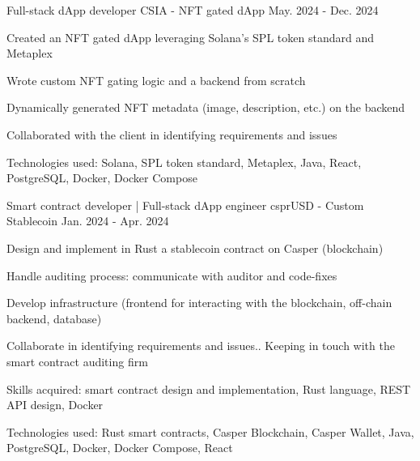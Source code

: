\begin{cventries}
  \cventry
    {Full-stack dApp developer} %
    {CSIA - NFT gated dApp} %
    {} %
    {May. 2024 - Dec. 2024} %
    {
      \begin{cvitems} %
        \item {Created an NFT gated dApp leveraging Solana's SPL token standard and Metaplex}
        \item {Wrote custom NFT gating logic and a backend from scratch}
        \item {Dynamically generated NFT metadata (image, description, etc.) on the backend}
        \item {Collaborated with the client in identifying requirements and issues}
        \item {Technologies used: Solana, SPL token standard, Metaplex, Java, React, PostgreSQL, Docker, Docker Compose}
      \end{cvitems}
    }

  \cventry
    {Smart contract developer | Full-stack dApp engineer} %
    {csprUSD - Custom Stablecoin} %
    {} %
    {Jan. 2024 - Apr. 2024} %
    {
      \begin{cvitems} %
        \item {Design and implement in Rust a stablecoin contract on Casper (blockchain)}
        \item {Handle auditing process: communicate with auditor and code-fixes}
        \item {Develop infrastructure (frontend for interacting with the blockchain, off-chain backend, database)}
        \item {Collaborate in identifying requirements and issues.. Keeping in touch with the smart contract auditing firm}
        \item {Skills acquired: smart contract design and implementation, Rust language, REST API design, Docker}
        \item {Technologies used: Rust smart contracts, Casper Blockchain, Casper Wallet, Java, PostgreSQL, Docker, Docker Compose, React}
      \end{cvitems}
    }


\end{cventries}
